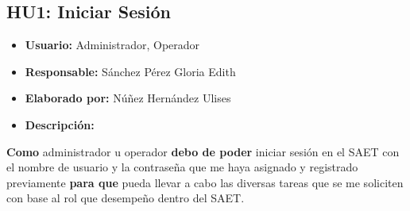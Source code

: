 \subsection{HU1: Iniciar Sesión}
\begin{itemize}
	\item \textbf{Usuario:} Administrador, Operador
	\item \textbf{Responsable:} Sánchez Pérez Gloria Edith
	\item \textbf{Elaborado por:} Núñez Hernández Ulises
	\item \textbf{Descripción:}
\end{itemize}
\textbf{Como} administrador u operador \textbf{debo de poder} iniciar sesión en el SAET con el nombre de usuario y la contraseña que me haya asignado y registrado previamente \textbf{para que} pueda llevar a cabo las diversas tareas que se me soliciten con base al rol que desempeño dentro del SAET.